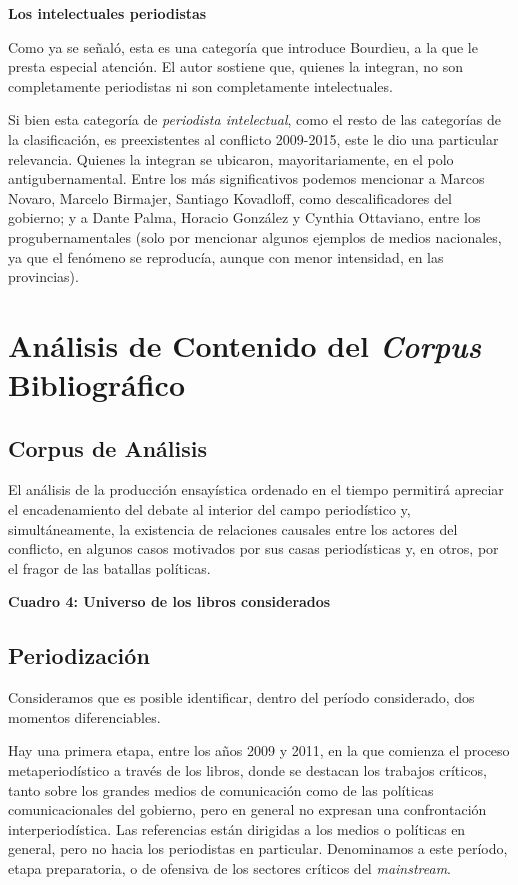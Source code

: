 \textbf{Los intelectuales periodistas}

Como ya se señaló, esta es una categoría que introduce Bourdieu, a la que le presta especial atención. El autor sostiene que, quienes la integran, no son completamente periodistas ni son completamente intelectuales.

Si bien esta categoría de \emph{periodista intelectual}, como el resto de las categorías de la clasificación, es preexistentes al conflicto 2009-2015, este le dio una particular relevancia. Quienes la integran se ubicaron, mayoritariamente, en el polo antigubernamental. Entre los más significativos podemos mencionar a Marcos Novaro, Marcelo Birmajer, Santiago Kovadloff, como descalificadores del gobierno; y a Dante Palma, Horacio González y Cynthia Ottaviano, entre los progubernamentales (solo por mencionar algunos ejemplos de medios nacionales, ya que el fenómeno se reproducía, aunque con menor intensidad, en las provincias).

\chapter{Análisis de Contenido del \emph{Corpus} Bibliográfico}

\section{Corpus de Análisis}

El análisis de la producción ensayística ordenado en el tiempo permitirá apreciar el encadenamiento del debate al interior del campo periodístico y, simultáneamente, la existencia de relaciones causales entre los actores del conflicto, en algunos casos motivados por sus casas periodísticas y, en otros, por el fragor de las batallas políticas.

\textbf{Cuadro 4: Universo de los libros considerados}


\section{Periodización}

Consideramos que es posible identificar, dentro del período considerado, dos momentos diferenciables.

Hay una primera etapa, entre los años 2009 y 2011, en la que comienza el proceso metaperiodístico a través de los libros, donde se destacan los trabajos críticos, tanto sobre los grandes medios de comunicación como de las políticas comunicacionales del gobierno, pero en general no expresan una confrontación interperiodística. Las referencias están dirigidas a los medios o políticas en general, pero no hacia los periodistas en particular. Denominamos a este período, etapa preparatoria, o de ofensiva de los sectores críticos del \emph{mainstream}.

